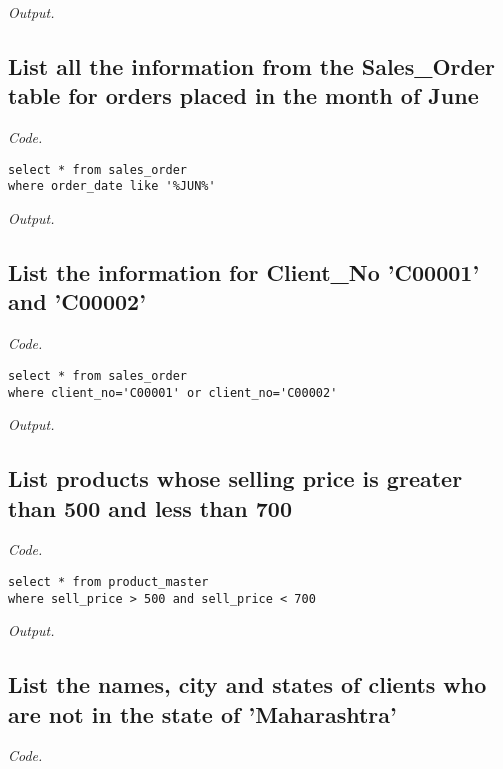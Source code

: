 \documentclass[12pt]{article}
\begin{document}
\textit{Output.}\\

\subsection{List all the information from the Sales\_Order table for orders placed in the month of June}

\textit{Code.}

\begin{lstlisting}
select * from sales_order
where order_date like '%JUN%'
\end{lstlisting}

\textit{Output.}\\

\subsection{List the information for Client\_No 'C00001' and 'C00002'}

\textit{Code.}

\begin{lstlisting}
select * from sales_order
where client_no='C00001' or client_no='C00002'
\end{lstlisting}

\textit{Output.}\\

\subsection{List products whose selling price is greater than 500 and less than 700}

\textit{Code.}

\begin{lstlisting}
select * from product_master
where sell_price > 500 and sell_price < 700
\end{lstlisting}

\textit{Output.}\\

\subsection{List the names, city and states of clients who are not in the state of 'Maharashtra'}

\textit{Code.}
\end{document}
